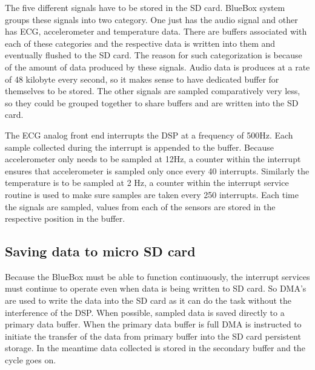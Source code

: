 The five different signals have to be stored in the SD card. BlueBox system groups these signals into two category. One just has the audio signal and other has ECG, accelerometer and temperature data. There are buffers associated with each of these categories and the respective data is written into them and eventually flushed to the SD card. The reason for such categorization is because of the amount of data produced by these signals. Audio data is produces at a rate of 48 kilobyte every second, so it makes sense to have dedicated buffer for themselves to be stored. The other signals are sampled comparatively very less, so they could be grouped together to share buffers and are written into the SD card. 

 \hspace{10mm}The ECG analog front end interrupts the DSP at a frequency of 500Hz. Each sample collected during the interrupt is appended to the buffer. Because accelerometer only needs to be sampled at 12Hz, a counter within the interrupt ensures that accelerometer is sampled only once every 40 interrupts. Similarly the temperature is to be sampled at 2 Hz, a counter within the interrupt service routine is used to make sure samples are taken every 250 interrupts. Each time the signals are sampled, values from each of the sensors are stored in the respective position in the buffer. 
\subsection{Saving data to micro SD card}

Because the BlueBox must be able to function continuously, the interrupt services must continue to operate even when data is being written to SD card. So DMA's are used to write the data into the SD card as it can do the task without the interference of the DSP. When possible, sampled data is saved directly to a primary data buffer. When the primary data buffer is full DMA is instructed to initiate the transfer of the data from primary buffer into the SD card persistent storage. In the meantime data collected is stored in the secondary buffer and the cycle goes on. 

